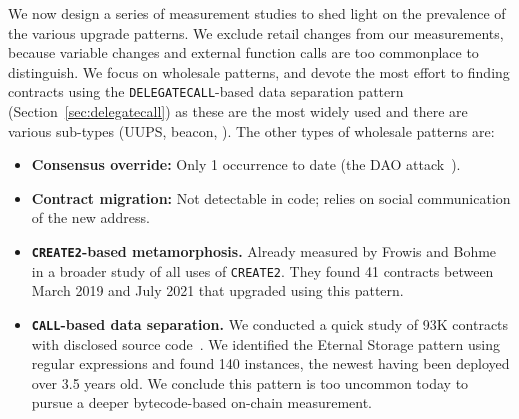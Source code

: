 We now design a series of measurement studies to shed light on the prevalence of the various upgrade patterns. We exclude retail changes from our measurements, because variable changes and external function calls are too commonplace to distinguish. We focus on wholesale patterns, and devote the most effort to finding contracts using the \texttt{DELEGATECALL}-based data separation pattern (Section~\ref{sec:delegatecall}) as these are the most widely used and there are various sub-types (UUPS, beacon, \etc). The other types of wholesale patterns are: 
\begin{itemize}
\item \textbf{Consensus override:} Only 1 occurrence to date (the DAO attack~\cite{dhillon2017dao}).
\item \textbf{Contract migration:} Not detectable in code; relies on social communication of the new address.
\item \textbf{\texttt{CREATE2}-based metamorphosis.} Already measured by Frowis and Bohme~\cite{frowisnot} in a broader study of all uses of \texttt{CREATE2}. They found 41 contracts between March 2019 and July 2021 that upgraded using this pattern.
\item \textbf{\texttt{CALL}-based data separation.} We conducted a quick study of 93K contracts with disclosed source code~\cite{smart_contract_sanctuary}. We identified the Eternal Storage pattern using regular expressions and found 140 instances, the newest having been deployed over 3.5 years old. We conclude this pattern is too uncommon today to pursue a deeper bytecode-based on-chain measurement.  
\end{itemize}




